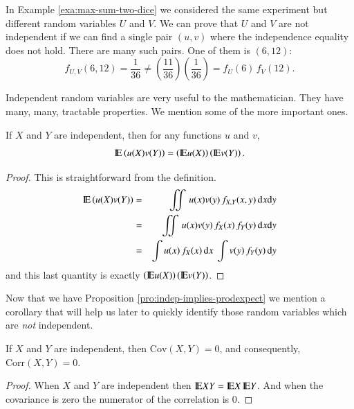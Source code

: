\documentclass[captions=tableheading]{scrbook}
\begin{document}
\begin{example}
In Example \ref{exa:max-sum-two-dice} we considered the same experiment but different random variables \(U\) and \(V\). We can prove that \(U\) and \(V\) are not independent if we can find a single pair \((u,v)\) where the independence equality does not hold. There are many such pairs. One of them is \((6,12)\):
\[
f_{U,V}(6,12)=\frac{1}{36}\neq\left(\frac{11}{36}\right)\left(\frac{1}{36}\right)=f_{U}(6)\, f_{V}(12).
\]
\end{example}

Independent random variables are very useful to the mathematician. They have many, many, tractable properties. We mention some of the more important ones.
\begin{prop}
\label{pro:indep-implies-prodexpect}
If \(X\) and \(Y\) are independent, then for any functions \(u\) and \(v\), 
\begin{equation}
\mathrm{I\hspace{-1.5pt}E}\left(u(X)v(Y)\right)=\left(\mathrm{I\hspace{-1.5pt}E} u(X)\right)\left(\mathrm{I\hspace{-1.5pt}E} v(Y)\right).
\end{equation}
\end{prop}

\begin{proof}
This is straightforward from the definition.
\begin{eqnarray*}
\mathrm{I\hspace{-1.5pt}E}\left(u(X)v(Y)\right) & = & \iint\, u(x)v(y)\, f_{X,Y}(x,y)\,\mathrm{d} x\mathrm{d} y\\
 & = & \iint\, u(x)v(y)\, f_{X}(x)\, f_{Y}(y)\,\mathrm{d} x\mathrm{d} y\\
 & = & \int u(x)\, f_{X}(x)\,\mathrm{d} x\ \int v(y)\, f_{Y}(y)\,\mathrm{d} y
\end{eqnarray*}
and this last quantity is exactly \(\left(\mathrm{I\hspace{-1.5pt}E} u(X)\right)\left(\mathrm{I\hspace{-1.5pt}E} v(Y)\right)\). 
\end{proof}

Now that we have Proposition \ref{pro:indep-implies-prodexpect} we mention a corollary that will help us later to quickly identify those random variables which are \emph{not} independent.

\begin{cor}
If \(X\) and \(Y\) are independent, then \(\mbox{Cov}(X,Y)=0\), and consequently,
\(\mbox{Corr}(X,Y)=0\).\label{cor:indep-implies-uncorr}
\end{cor}

\begin{proof}
When \(X\) and \(Y\) are independent then \(\mathrm{I\hspace{-1.5pt}E} XY=\mathrm{I\hspace{-1.5pt}E} X\,\mathrm{I\hspace{-1.5pt}E} Y\). And when the covariance is zero the numerator of the correlation is 0.
\end{proof}
\end{document}
